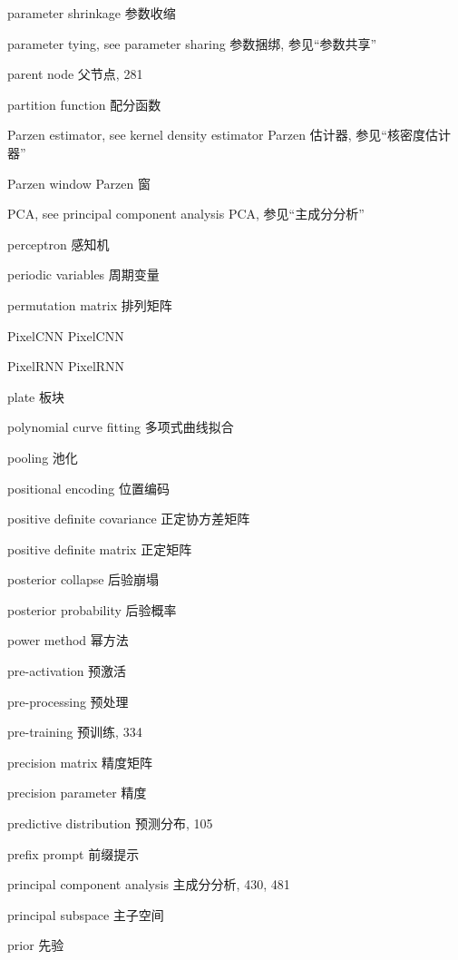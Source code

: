 parameter shrinkage  参数收缩 \par
parameter tying, see parameter sharing  参数捆绑, 参见“参数共享” \par
parent node  父节点, 281 \par
partition function  配分函数 \par
Parzen estimator, see kernel density estimator  Parzen 估计器, 参见“核密度估计器” \par
Parzen window  Parzen 窗 \par
PCA, see principal component analysis  PCA, 参见“主成分分析” \par
perceptron  感知机 \par
periodic variables  周期变量 \par
permutation matrix  排列矩阵 \par
PixelCNN  PixelCNN \par
PixelRNN  PixelRNN \par
plate  板块 \par
polynomial curve fitting  多项式曲线拟合 \par
pooling  池化 \par
positional encoding  位置编码 \par
positive definite covariance  正定协方差矩阵 \par
positive definite matrix  正定矩阵 \par
posterior collapse  后验崩塌 \par
posterior probability  后验概率 \par
power method  幂方法 \par
pre-activation  预激活 \par
pre-processing  预处理 \par
pre-training  预训练, 334 \par
precision matrix  精度矩阵 \par
precision parameter  精度 \par
predictive distribution  预测分布, 105 \par
prefix prompt  前缀提示 \par
principal component analysis  主成分分析, 430, 481 \par
principal subspace  主子空间 \par
prior  先验 \par
